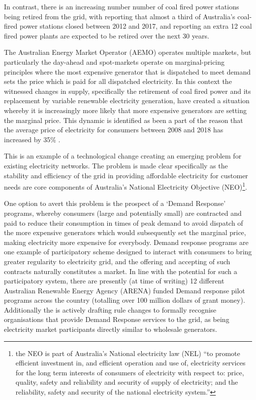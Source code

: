 In contrast, there is an increasing number number of coal fired power stations being retired from the grid,
with \cite{doi:10.1111/1467-8489.12289} reporting that almost a third of Australia's coal-fired power stations closed between 2012 and 2017,
and \cite{australianenergymarketoperatorlimited2018} reporting an extra 12 coal fired power plants are expected to be retired over the next 30 years.

The Australian Energy Market Operator (AEMO) operates multiple markets, but particularly the day-ahead and spot-markets operate on marginal-pricing principles where the most expensive generator that is dispatched to meet demand sets the price which is paid for all dispatched electricity.
In this context the witnessed changes in supply, specifically the retirement of coal fired power and its replacement by variable renewable electricity generation, have created a situation whereby it is increasingly more likely that more expensive generators are setting the marginal price.
This dynamic is identified as been a part of the reason that the average price of electricity for consumers between 2008 and 2018 has increased by 35\% \citep{australiancompetitionconsumercommission2018}.

This is an example of a technological change creating an emerging problem for existing electricity networks. The problem is made clear specifically as the stability and efficiency of the grid in providing affordable electricity for customer needs are core components of Australia's National Electricity Objective (NEO)\footnote{the NEO is part of Australia's National electricity law (NEL) ``to promote efficient investment in, and efficient operation and use of, electricity services for the long term interests of consumers of electricity with respect to: price, quality, safety and reliability and security of supply of electricity; and the reliability, safety and security of the national electricity system.''}.

One option to avert this problem is the prospect of a `Demand Response' programs, whereby consumers (large and potentially small) are contracted and paid to reduce their consumption in times of peak demand to avoid dispatch of the more expensive generators which would subsequently set the marginal price, making electricity more expensive for everybody.
Demand response programs are one example of participatory scheme designed to interact with consumers to bring greater regularity to electricity grid, and the offering and accepting of such contracts naturally constitutes a market.
In line with the potential for such a participatory system, there are presently (at time of writing) 12 different Australian Renewable Energy Agency (ARENA) funded Demand response pilot programs across the country (totalling over 100 million dollars of grant money).
Additionally the \cite{australianenergymarketcommission2020} is actively drafting rule changes to formally recognise organisations that provide Demand Response services to the grid, as being electricity market participants directly similar to wholesale generators.

